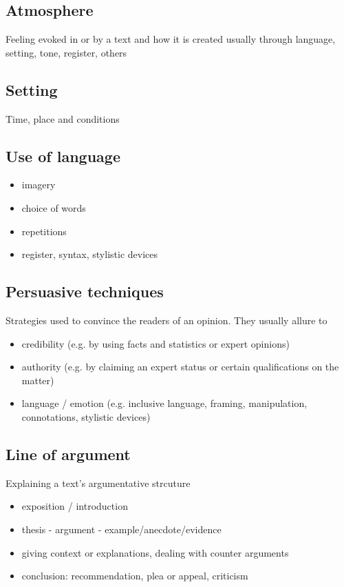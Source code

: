 \documentclass{article}
\begin{document}
	\subsection{Atmosphere}
	Feeling evoked in or by a text and how it is created usually through language, setting, tone, register, others

	\subsection{Setting}
	Time, place and conditions

	\subsection{Use of language}
	\begin{itemize}
		\item imagery
		\item choice of words
		\item repetitions
		\item register, syntax, stylistic devices
	\end{itemize}

	\subsection{Persuasive techniques}
	Strategies used to convince the readers of an opinion. They usually allure to
	
	\begin{itemize}
		\item credibility (e.g. by using facts and statistics or expert opinions)
		\item authority (e.g. by claiming an expert status or certain qualifications on the matter)
		\item language / emotion (e.g. inclusive language, framing, manipulation, connotations, stylistic devices)
	\end{itemize}

	\subsection{Line of argument}
	Explaining a text's argumentative strcuture

	\begin{itemize}
		\item exposition / introduction
		\item thesis - argument - example/anecdote/evidence
		\item giving context or explanations, dealing with counter arguments
		\item conclusion: recommendation, plea or appeal, criticism
	\end{itemize}
\end{document}
